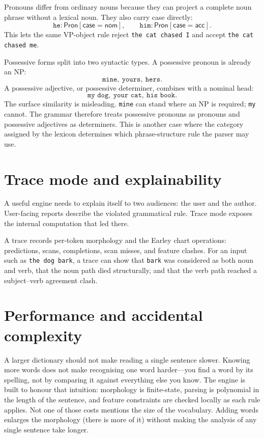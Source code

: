 \documentclass[11pt]{article}
\theoremstyle{definition}
\theoremstyle{plain}
\theoremstyle{remark}
\begin{document}
Pronouns differ from ordinary nouns because they can project a complete noun
phrase without a lexical noun. They also carry case directly:
\[
  \texttt{he} : \textsf{Pron}[\textsf{case}=\textsf{nom}],
  \qquad
  \texttt{him} : \textsf{Pron}[\textsf{case}=\textsf{acc}].
\]
This lets the same VP-object rule reject \texttt{the cat chased I} and accept
\texttt{the cat chased me}.

Possessive forms split into two syntactic types. A possessive pronoun is already
an NP:
\[
  \texttt{mine},\ \texttt{yours},\ \texttt{hers}.
\]
A possessive adjective, or possessive determiner, combines with a nominal head:
\[
  \texttt{my dog},\ \texttt{your cat},\ \texttt{his book}.
\]
The surface similarity is misleading. \texttt{mine} can stand where an NP is
required; \texttt{my} cannot. The grammar therefore treats possessive pronouns
as pronouns and possessive adjectives as determiners. This is another case where
the category assigned by the lexicon determines which phrase-structure rule the
parser may use.

\section{Trace mode and explainability}
\label{sec:trace}

A useful engine needs to explain itself to two audiences: the user and the author. User-facing
reports describe the violated grammatical rule. Trace mode exposes the internal computation that
led there.

A trace records per-token morphology and the Earley chart operations: predictions, scans,
completions, scan misses, and feature clashes. For an input such as \texttt{the dog bark}, a
trace can show that \texttt{bark} was considered as both noun and verb, that the noun path died
structurally, and that the verb path reached a subject--verb agreement clash.

\section{Performance and accidental complexity}

A larger dictionary should not make reading a single sentence slower. Knowing
more words does not make recognising one word harder---you find a word by its
spelling, not by comparing it against everything else you know. The engine is
built to honour that intuition: morphology is finite-state, parsing is polynomial
in the length of the sentence, and feature constraints are checked locally as each
rule applies. Not one of those costs mentions the size of the vocabulary. Adding
words enlarges the morphology (there is more of it) without making the analysis
of any single sentence take longer.
\end{document}
